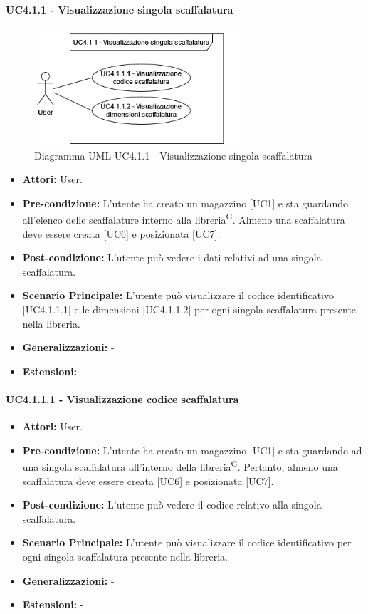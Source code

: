 \paragraph{UC4.1.1 - Visualizzazione singola scaffalatura}
\begin{figure}[H]
  \centering
  \includegraphics[width=0.7\textwidth]{UC_diagrams_1-10/UC4.1.1.drawio.png}
   \caption{Diagramma UML UC4.1.1 - Visualizzazione singola scaffalatura}
\end{figure}
\begin{itemize}
    \item \textbf{Attori:} User.
    \item \textbf{Pre-condizione:} L'utente ha creato un magazzino [UC1] e sta guardando all'elenco delle scaffalature interno alla libreria\textsuperscript{G}. Almeno una scaffalatura deve essere creata [UC6] e posizionata [UC7].
    \item \textbf{Post-condizione:} L'utente può vedere i dati relativi ad una singola scaffalatura.
    \item \textbf{Scenario Principale:} L'utente può visualizzare il codice identificativo [UC4.1.1.1] e le dimensioni [UC4.1.1.2] per ogni singola scaffalatura presente nella libreria.
    \item \textbf{Generalizzazioni:} -
    \item \textbf{Estensioni:} -
\end{itemize}


\paragraph{UC4.1.1.1 - Visualizzazione codice scaffalatura}
\begin{itemize}
    \item \textbf{Attori:} User.
    \item \textbf{Pre-condizione:} L'utente ha creato un magazzino [UC1] e sta guardando ad una singola scaffalatura all'interno della libreria\textsuperscript{G}. Pertanto, almeno una scaffalatura deve essere creata [UC6] e posizionata [UC7].
    \item \textbf{Post-condizione:} L'utente può vedere il codice relativo alla singola scaffalatura.
    \item \textbf{Scenario Principale:} L'utente può visualizzare il codice identificativo per ogni singola scaffalatura presente nella libreria.
    \item \textbf{Generalizzazioni:} -
    \item \textbf{Estensioni:} -
\end{itemize}


